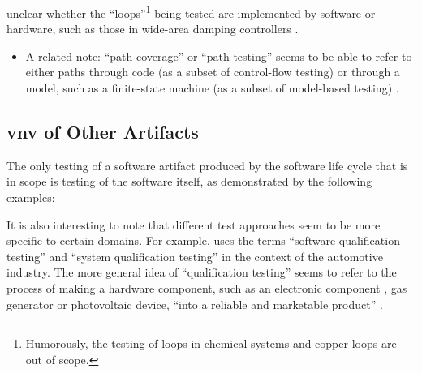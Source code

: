 \begin{itemize}
          unclear whether the ``loops''\footnote{Humorously, the testing of
              loops in chemical systems \citep{Dominguez-PumarEtAl2020} and
              copper loops \citep{Goralski1999} are out of scope.} being
          tested are implemented by software or hardware, such as those in
          wide-area damping controllers \citep{PierreEtAl2017, TrudnowskiEtAl2017}.
          \begin{itemize}
              \item A related note: ``path coverage'' or ``path testing''
                    seems to be able to refer to either paths through code
                    (as a subset of control-flow testing)
                    \citep[p.~5-13]{SWEBOK2024} or through a model, such as
                    a finite-state machine (as a subset of model-based
                    testing) \citep[p.~184]{DoğanEtAl2014}.
          \end{itemize}
          \fi
\end{itemize}

\subsection[V\&V of Other Artifacts]{\acs{vnv} of Other Artifacts}
The only testing of a software artifact produced by the software life cycle
that is in scope is testing of the software itself, as demonstrated by the
following examples:


\ifnotpaper
    It is also interesting to note that different test approaches seem to be more
    specific to certain domains. For example, \citet{SPICE2022} uses the terms
    ``software qualification testing'' and ``system qualification testing'' in
    the context of the automotive industry. The more general idea of
    ``qualification testing'' seems to refer to the process of
    making a hardware component, such as an electronic component
    \citep{AhsanEtAl2020}, gas generator \citep{ParateEtAl2021} or photovoltaic
    device, ``into a reliable and marketable product'' \citep[p.~1]{SuhirEtAl2013}.
\fi

